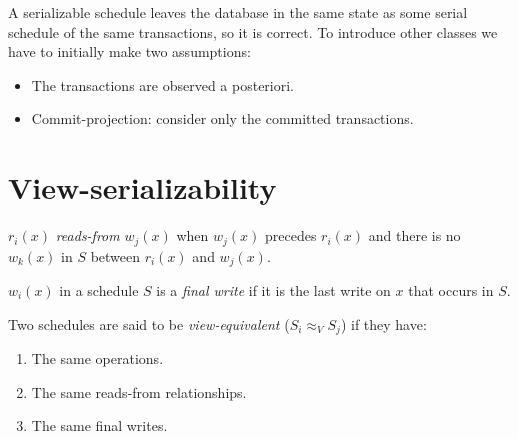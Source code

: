 \documentclass[12pt, a4paper]{report}
\begin{document}
    A serializable schedule leaves the database in the same state as some serial schedule of the same transactions, so it is correct. To introduce other classes we have to initially
    make two assumptions: 
    \begin{itemize}
        \item The transactions are observed a posteriori. 
        \item Commit-projection: consider only the committed transactions. 
    \end{itemize}

    \section{View-serializability}
    \begin{definition}
        $r_i(x)$ \emph{reads-from} $w_j(x)$ when  $w_j(x)$  precedes  $r_i(x)$ and there is no  $w_k(x)$ in $S$ between  $r_i(x)$  and  $w_j(x)$. 
        
        $w_i(x)$ in a schedule $S$ is a \emph{final write} if it is the last write on $x$ that occurs in $S$. 


        Two schedules are said to be \emph{view-equivalent} ($S_i \approx_V S_j$) if they have:
        \begin{enumerate}
            \item The same operations. 
            \item The same reads-from relationships.
            \item The same final writes. 
        \end{enumerate}
    \end{definition}
\end{document}
